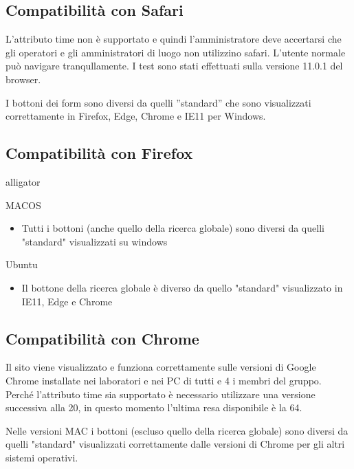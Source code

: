 \documentclass[10pt, a4paper]{article}
\begin{document}
\subsection{Compatibilità con Safari} \marginpar{\dbend}
L'attributo time non è supportato e quindi l'amministratore deve accertarsi che gli operatori e gli amministratori di luogo 
non utilizzino safari. L'utente normale può navigare tranqullamente. I test sono stati effettuati sulla versione 11.0.1
del browser.

I bottoni dei form sono diversi da quelli ''standard'' che sono visualizzati correttamente in Firefox, Edge, Chrome e IE11 
per Windows.

\subsection{Compatibilità con Firefox}
\begin{labeling}{alligator}
	\item[MACOS] \item[]
		\begin{itemize}
			\item{Tutti i bottoni (anche quello della ricerca globale) sono diversi da quelli "standard" visualizzati su windows}
		\end{itemize}
	
	\item[Ubuntu] \item[]
	\begin{itemize}
		\item{Il bottone della ricerca globale è diverso da quello "standard" visualizzato in IE11, Edge e Chrome}
	\end{itemize}
\end{labeling}

\subsection{Compatibilità con Chrome}
Il sito viene visualizzato e funziona correttamente sulle versioni di Google Chrome installate nei laboratori e nei PC di tutti e 4 i
membri del gruppo. Perché l'attributo time sia supportato è necessario utilizzare una versione successiva alla 20, in questo
momento l'ultima resa disponibile è la 64.

Nelle versioni MAC i bottoni (escluso quello della ricerca globale) sono diversi da quelli "standard" visualizzati correttamente dalle versioni
di Chrome per gli altri sistemi operativi.
\end{document}
